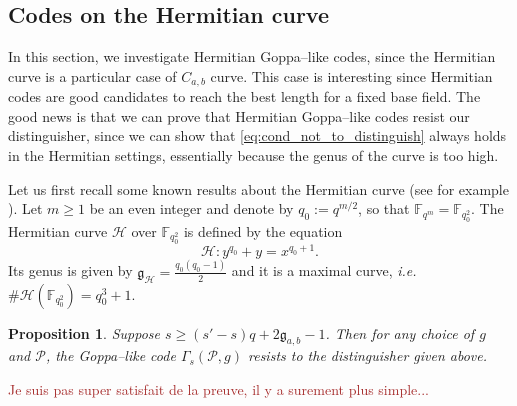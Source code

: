 \documentclass[a4paper]{article}
\newtheorem{proposition}[thm]{Proposition}
\theoremstyle{definition}
\theoremstyle{remark}
\newcommand{\calP}{\mathcal{P}}
\newcommand{\calH}{\mathcal{H}}
\newcommand{\fqm}{\mathbb{F}_{q^m}}
\newcommand{\fqo}{\mathbb{F}_{q_0^2}}
\newcommand\mathieu[1]{\textcolor{brown}{#1}}
\begin{document}
\subsection{Codes on the Hermitian curve}

In this section, we investigate Hermitian Goppa--like codes, since the Hermitian curve is a particular case of $C_{a,b}$ curve. This case is interesting since Hermitian codes are good candidates to reach the best length for a fixed base field. The good news is that we can prove that Hermitian Goppa--like codes resist our distinguisher, since we can show that \eqref{eq:cond_not_to_distinguish} always holds in the Hermitian settings, essentially because  the genus of the curve is too high. 

\noindent Let us first recall some known results about the Hermitian curve (see for example \cite{Sti09}). Let $m \geq 1$  be an even integer and denote by $q_0 := q^{m/2}$, so that $\fqm = \fqo$. The Hermitian curve $\calH$ over $\fqo$ is defined by the equation
$$\calH : y^{q_0}+y = x^{q_0+1}.$$
Its genus is given by $\mathfrak{g}_{\calH} = \frac{q_0(q_0-1)}{2}$ and it is a maximal curve, \emph{i.e.} $\#\calH(\fqo) = q_0^3+1$.


\begin{proposition} \label{prop:Hermitian_Goppa_like_are_secured}
    Suppose $s \geq (s'-s)q+2\mathfrak{g}_{a,b}-1$. Then for any choice of $g$ and $\calP$, the Goppa--like code $\Gamma_s(\calP,g)$ resists to the distinguisher given above.
\end{proposition}

\mathieu{Je suis pas super satisfait de la preuve, il y a surement plus simple...}
\end{document}
